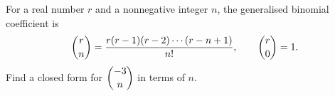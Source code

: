 For a real number $r$ and a nonnegative integer $n$, the generalised binomial coefficient is
\[\dbinom rn=\dfrac{r(r-1)(r-2)\cdots(r-n+1)}{n!},\qquad \dbinom r0=1 .\]
Find a closed form for $\dbinom{-3}{n}$ in terms of $n$.
